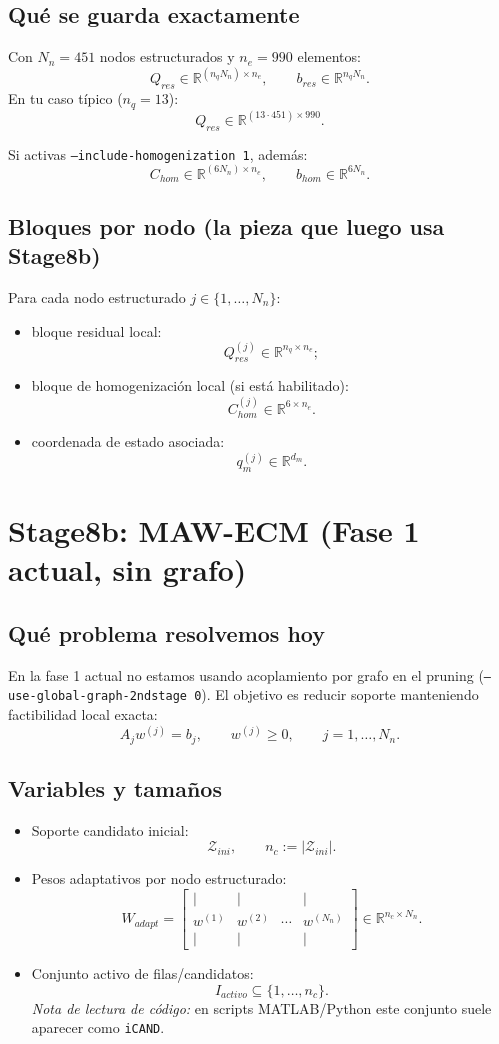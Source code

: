 \documentclass[11pt,a4paper]{article}
\begin{document}
\subsection{Qué se guarda exactamente}
Con $N_n=451$ nodos estructurados y $n_e=990$ elementos:
\[
Q_{res}\in\mathbb{R}^{(n_qN_n)\times n_e},
\qquad
b_{res}\in\mathbb{R}^{n_qN_n}.
\]
En tu caso típico ($n_q=13$):
\[
Q_{res}\in\mathbb{R}^{(13\cdot451)\times990}.
\]

Si activas \texttt{--include-homogenization 1}, además:
\[
C_{hom}\in\mathbb{R}^{(6N_n)\times n_e},
\qquad
b_{hom}\in\mathbb{R}^{6N_n}.
\]

\subsection{Bloques por nodo (la pieza que luego usa Stage8b)}
Para cada nodo estructurado $j\in\{1,\dots,N_n\}$:
\begin{itemize}[leftmargin=1.5em]
\item bloque residual local:
\[
Q_{res}^{(j)}\in\mathbb{R}^{n_q\times n_e};
\]
\item bloque de homogenización local (si está habilitado):
\[
C_{hom}^{(j)}\in\mathbb{R}^{6\times n_e}.
\]
\item coordenada de estado asociada:
\[
q_m^{(j)}\in\mathbb{R}^{d_m}.
\]
\end{itemize}

\section{Stage8b: MAW-ECM (Fase 1 actual, \textbf{sin grafo})}
\subsection{Qué problema resolvemos hoy}
En la fase 1 actual no estamos usando acoplamiento por grafo en el pruning
(\texttt{--use-global-graph-2ndstage 0}).
El objetivo es reducir soporte manteniendo factibilidad local exacta:
\[
A_jw^{(j)}=b_j,\qquad w^{(j)}\ge 0,\qquad j=1,\dots,N_n.
\]

\subsection{Variables y tamaños}
\begin{itemize}[leftmargin=1.5em]
\item Soporte candidato inicial:
\[
\mathcal Z_{ini},\qquad n_c:=|\mathcal Z_{ini}|.
\]
\item Pesos adaptativos por nodo estructurado:
\[
W_{adapt}=
\begin{bmatrix}
\vert & \vert &  & \vert\\
w^{(1)} & w^{(2)} & \cdots & w^{(N_n)}\\
\vert & \vert &  & \vert
\end{bmatrix}
\in\mathbb{R}^{n_c\times N_n}.
\]
\item Conjunto activo de filas/candidatos:
\[
I_{activo}\subseteq\{1,\dots,n_c\}.
\]
\textit{Nota de lectura de código:} en scripts MATLAB/Python este conjunto suele aparecer
como \texttt{iCAND}.
\end{itemize}
\end{document}

